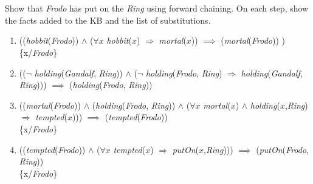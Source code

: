 \documentclass[paper=a4, fontsize=11pt]{scrartcl} %
\begin{document}
\section{}

\begin{fancyquotes}
  Show that \textit{Frodo} has put on the \textit{Ring} using forward
  chaining. On each step, show the facts added to the KB and the list
  of substitutions.
\end{fancyquotes}

\begin{enumerate}
\item
((\textit{hobbit}(\textit{Frodo}))
$\land$
($\forall x$ \textit{hobbit}($x$) $\Rightarrow$ \textit{mortal}($x$))
$\implies$
(\textit{mortal}(\textit{Frodo}))
)\\
\{x/\textit{Frodo}\}

\item
(($\lnot$ \textit{holding}(\textit{Gandalf}, \textit{Ring}))
$\land$
($\lnot$ \textit{holding}(\textit{Frodo}, \textit{Ring}) $\Rightarrow$
\textit{holding}(\textit{Gandalf}, \textit{Ring})))
$\implies$
(\textit{holding}(\textit{Frodo}, \textit{Ring}))

\item
((\textit{mortal}(\textit{Frodo}))
$\land$
(\textit{holding}(\textit{Frodo}, \textit{Ring}))
$\land$
($\forall x$ \textit{mortal}($x$) $\land$
  \textit{holding}($x$,\textit{Ring}) $\Rightarrow$
  \textit{tempted}($x$)))
$\implies$
(\textit{tempted}(\textit{Frodo}))\\
\{x/\textit{Frodo}\}

\item
((\textit{tempted}(\textit{Frodo}))
$\land$
($\forall x$ \textit{tempted}($x$) $\Rightarrow$
\textit{putOn}($x$,\textit{Ring})))
$\implies$
(\textit{putOn}(\textit{Frodo}, \textit{Ring}))\\
\{x/\textit{Frodo}\}
\end{enumerate}


\section{}
\end{document}
